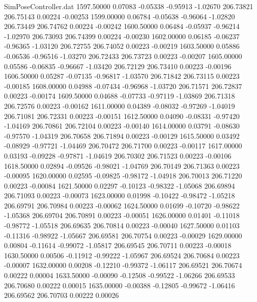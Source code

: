 \begin{filecontents}{SimPoseController.dat}
1597.50000    0.07083   -0.05338    -0.95913   -1.02670  206.73821  206.75143    0.00224   -0.00253
1599.00000    0.06784   -0.05638    -0.96064   -1.02820  206.73449  206.74762    0.00224   -0.00242
1600.50000    0.06484   -0.05937    -0.96214   -1.02970  206.73093  206.74399    0.00224   -0.00230
1602.00000    0.06185   -0.06237    -0.96365   -1.03120  206.72755  206.74052    0.00223   -0.00219
1603.50000    0.05886   -0.06536    -0.96516   -1.03270  206.72433  206.73723    0.00223   -0.00207
1605.00000    0.05586   -0.06835    -0.96667   -1.03420  206.72129  206.73410    0.00223   -0.00196
1606.50000    0.05287   -0.07135    -0.96817   -1.03570  206.71842  206.73115    0.00223   -0.00185
1608.00000    0.04988   -0.07434    -0.96968   -1.03720  206.71571  206.72837    0.00223   -0.00174
1609.50000    0.04688   -0.07733    -0.97119   -1.03869  206.71318  206.72576    0.00223   -0.00162
1611.00000    0.04389   -0.08032    -0.97269   -1.04019  206.71081  206.72331    0.00223   -0.00151
1612.50000    0.04090   -0.08331    -0.97420   -1.04169  206.70861  206.72104    0.00223   -0.00140
1614.00000    0.03791   -0.08630    -0.97570   -1.04319  206.70658  206.71894    0.00223   -0.00129
1615.50000    0.03492   -0.08929    -0.97721   -1.04469  206.70472  206.71700    0.00223   -0.00117
1617.00000    0.03193   -0.09228    -0.97871   -1.04619  206.70302  206.71523    0.00223   -0.00106
1618.50000    0.02894   -0.09526    -0.98021   -1.04769  206.70149  206.71363    0.00223   -0.00095
1620.00000    0.02595   -0.09825    -0.98172   -1.04918  206.70013  206.71220    0.00223   -0.00084
1621.50000    0.02297   -0.10123    -0.98322   -1.05068  206.69894  206.71093    0.00223   -0.00073
1623.00000    0.01998   -0.10422    -0.98472   -1.05218  206.69791  206.70984    0.00223   -0.00062
1624.50000    0.01699   -0.10720    -0.98622   -1.05368  206.69704  206.70891    0.00223   -0.00051
1626.00000    0.01401   -0.11018    -0.98772   -1.05518  206.69635  206.70814    0.00223   -0.00040
1627.50000    0.01103   -0.11316    -0.98922   -1.05667  206.69581  206.70754    0.00223   -0.00029
1629.00000    0.00804   -0.11614    -0.99072   -1.05817  206.69545  206.70711    0.00223   -0.00018
1630.50000    0.00506   -0.11912    -0.99222   -1.05967  206.69524  206.70684    0.00223   -0.00007
1632.00000    0.00208   -0.12210    -0.99372   -1.06117  206.69521  206.70674    0.00222    0.00004
1633.50000   -0.00090   -0.12508    -0.99522   -1.06266  206.69533  206.70680    0.00222    0.00015
1635.00000   -0.00388   -0.12805    -0.99672   -1.06416  206.69562  206.70703    0.00222    0.00026

\end{filecontents}
